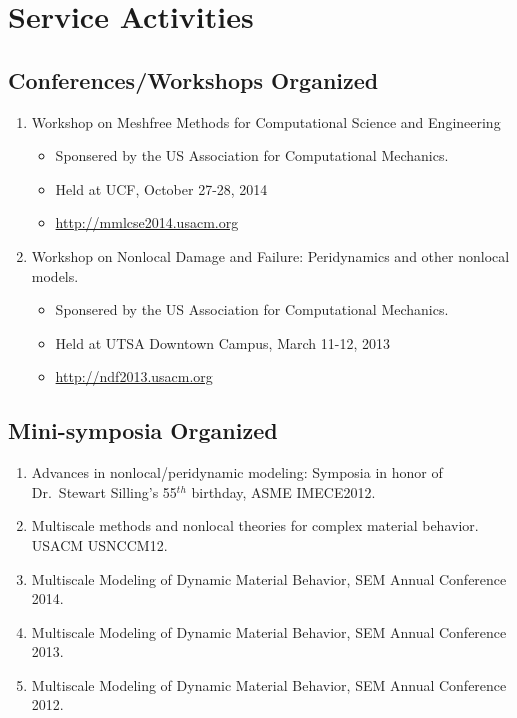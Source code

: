 \section*{Service Activities}

\subsection*{Conferences/Workshops Organized}
  \begin{enumerate}
      \item Workshop on Meshfree Methods for Computational Science and Engineering
          \begin{itemize}
             \item Sponsered by the US Association for Computational Mechanics.
             \item Held at UCF, October 27-28, 2014
             \item \url{http://mmlcse2014.usacm.org}
          \end{itemize}
      \item Workshop on Nonlocal Damage and Failure: Peridynamics and other nonlocal models.  
          \begin{itemize}
             \item Sponsered by the US Association for Computational Mechanics.
             \item Held at UTSA Downtown Campus, March 11-12, 2013
             \item \url{http://ndf2013.usacm.org}
          \end{itemize}
  \end{enumerate}

\subsection*{Mini-symposia Organized}

\begin{enumerate}
    \item Advances in nonlocal/peridynamic modeling: Symposia in honor of Dr.~Stewart Silling's 55$^{th}$ birthday, ASME IMECE2012.
    \item Multiscale methods and nonlocal theories for complex material behavior. USACM USNCCM12.
    \item Multiscale Modeling of Dynamic Material Behavior, SEM Annual Conference 2014.
    \item Multiscale Modeling of Dynamic Material Behavior, SEM Annual Conference 2013.
    \item Multiscale Modeling of Dynamic Material Behavior, SEM Annual Conference 2012.
\end{enumerate}

